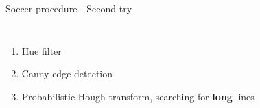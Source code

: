 \documentclass[12pt]{beamer}
\begin{document}
\begin{frame}{Soccer procedure - Second try}
    \begin{columns}
    \begin{enumerate}
        \item<1-> \textcolor<4>{mLightGreen}{Hue} filter
        \item<2-> Canny edge detection
        \item<3-> Probabilistic Hough transform, searching for \textbf{long} lines
    \end{enumerate}
\end{columns}
\end{frame}
\end{document}
